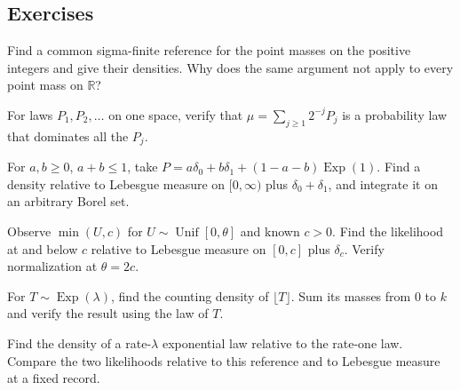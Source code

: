 \documentclass[11pt,oneside]{book}
\theoremstyle{definition}
\theoremstyle{remark}
\newcommand{\R}{\mathbb R}
\begin{document}
\subsection{Exercises}
\label{subsec:worked-examples-1-4}

\begin{practiceexercise}
\label{wex:countable-dirac-domination}
Find a common sigma-finite reference for the point masses on the positive
integers and give their densities. Why does the same argument not apply to
every point mass on $\R$?
\end{practiceexercise}

\begin{practiceexercise}
\label{wex:weighted-reference-mixture}
For laws $P_1,P_2,\ldots$ on one space, verify that
$\mu=\sum_{j\ge1}2^{-j}P_j$ is a probability law that dominates all the
$P_j$.
\end{practiceexercise}

\begin{practiceexercise}
\label{wex:atoms-and-exponential-reference}
For $a,b\ge0$, $a+b\le1$, take
$P=a\delta_0+b\delta_1+(1-a-b)\operatorname{Exp}(1)$. Find a density
relative to Lebesgue measure on $[0,\infty)$ plus $\delta_0+\delta_1$, and
integrate it on an arbitrary Borel set.
\end{practiceexercise}

\begin{practiceexercise}
\label{wex:capped-uniform-likelihood}
Observe $\min(U,c)$ for $U\sim\operatorname{Unif}[0,\theta]$ and known
$c>0$. Find the likelihood at and below $c$ relative to Lebesgue measure on
$[0,c]$ plus $\delta_c$. Verify normalization at $\theta=2c$.
\end{practiceexercise}

\begin{practiceexercise}
\label{wex:rounded-exponential-masses}
For $T\sim\operatorname{Exp}(\lambda)$, find the counting density of
$\lfloor T\rfloor$. Sum its masses from $0$ to $k$ and verify the result
using the law of $T$.
\end{practiceexercise}

\begin{practiceexercise}
\label{wex:exponential-reference-change}
Find the density of a rate-$\lambda$ exponential law relative to the
rate-one law. Compare the two likelihoods relative to this reference and to
Lebesgue measure at a fixed record.
\end{practiceexercise}
\end{document}
